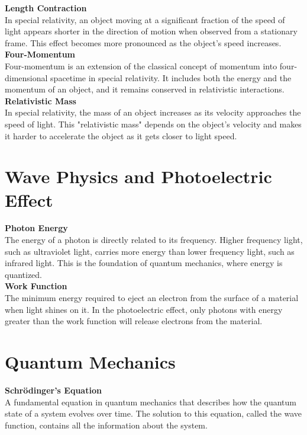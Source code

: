 \documentclass[a4paper,12pt]{article}
\begin{document}
\begin{footnotesize}
\begin{multicols}{3}
\textbf{Length Contraction} \\
In special relativity, an object moving at a significant fraction of the speed of light appears shorter in the direction of motion when observed from a stationary frame. This effect becomes more pronounced as the object’s speed increases. \\


\textbf{Four-Momentum} \\
Four-momentum is an extension of the classical concept of momentum into four-dimensional spacetime in special relativity. It includes both the energy and the momentum of an object, and it remains conserved in relativistic interactions. \\

\textbf{Relativistic Mass} \\
In special relativity, the mass of an object increases as its velocity approaches the speed of light. This "relativistic mass" depends on the object's velocity and makes it harder to accelerate the object as it gets closer to light speed. \\


\section*{Wave Physics and Photoelectric Effect}

\textbf{Photon Energy} \\
The energy of a photon is directly related to its frequency. Higher frequency light, such as ultraviolet light, carries more energy than lower frequency light, such as infrared light. This is the foundation of quantum mechanics, where energy is quantized. \\


\textbf{Work Function} \\
The minimum energy required to eject an electron from the surface of a material when light shines on it. In the photoelectric effect, only photons with energy greater than the work function will release electrons from the material. \\


\section*{Quantum Mechanics}

\textbf{Schrödinger's Equation} \\
A fundamental equation in quantum mechanics that describes how the quantum state of a system evolves over time. The solution to this equation, called the wave function, contains all the information about the system. \\



\end{multicols}
\end{footnotesize}
\end{document}
